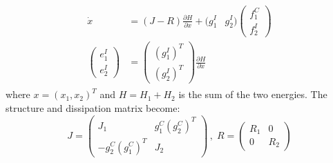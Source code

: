 \documentclass[a4paper,twoside, openright,12pt]{report}
\begin{document}
\begin{eqnarray}
\begin{aligned}
	\dot{x} &= (J - R)\frac{\partial H}{\partial x}+ (g_1^I & g_2^I)\begin{pmatrix}f_1^C \\ f_2^I\end{pmatrix}\\
	\begin{pmatrix}e_1^I \\ e_2^I\end{pmatrix} &= \begin{pmatrix}(g_1^I)^T \\ (g_2^I)^T\end{pmatrix}\frac{\partial H}{\partial x}
\end{aligned}
\end{eqnarray}
where $ x = (x_1, x_2)^T $ and $ H = H_1 + H_2 $ is the sum of the two energies. The structure and dissipation matrix become:
\[J = \begin{pmatrix} J_1 & g_1^C(g_2^C)^T \\ 
-g_2^C(g_1^C)^T & J_2\end{pmatrix} \, , \; 
R = \begin{pmatrix}
R_1 & 0 \\ 0 & R_2\end{pmatrix}\]
\end{document}
